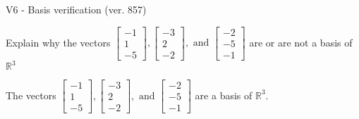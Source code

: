 \begin{exercise}
  \begin{exerciseTitle}V6 - Basis verification (ver. 857)\end{exerciseTitle}
  \begin{exerciseStatement}
    Explain why the vectors \(\left[\begin{array}{r}
-1 \\
1 \\
-5
\end{array}\right] , \left[\begin{array}{r}
-3 \\
2 \\
-2
\end{array}\right] , \text{ and } \left[\begin{array}{r}
-2 \\
-5 \\
-1
\end{array}\right]\) are or are not a basis of \(\mathbb{R}^3\)	


  \end{exerciseStatement}
  \begin{exerciseAnswer}
   The vectors \(\left[\begin{array}{r}
-1 \\
1 \\
-5
\end{array}\right] , \left[\begin{array}{r}
-3 \\
2 \\
-2
\end{array}\right] , \text{ and } \left[\begin{array}{r}
-2 \\
-5 \\
-1
\end{array}\right]\) 
  	 are  a basis of \(\mathbb{R}^3\).
  


  \end{exerciseAnswer}
\end{exercise}